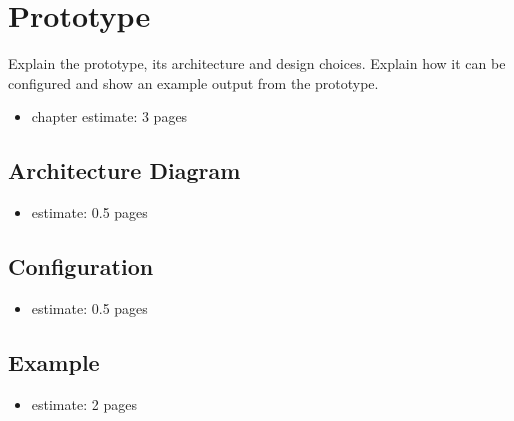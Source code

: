 \chapter{Prototype}
\label{chap:prototype}

Explain the prototype, its architecture and design choices.
Explain how it can be configured and show an example output from the prototype.

\begin{itemize}
    \item chapter estimate: 3 pages
\end{itemize}

\section{Architecture Diagram}
\label{sec:p_architecture_diagram}

\begin{itemize}
    \item estimate: 0.5 pages
\end{itemize}

\section{Configuration}
\label{sec:p_configuration}

\begin{itemize}
    \item estimate: 0.5 pages
\end{itemize}

\section{Example}
\label{sec:p_example}

\begin{itemize}
    \item estimate: 2 pages
\end{itemize}